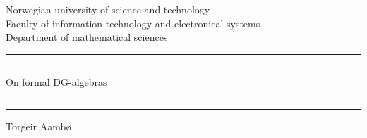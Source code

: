 \begin{titlingpage}



    \vspace*{5cm}
    \begin{center}
	Norwegian university of science and 		technology \\
	Faculty of information technology and 		electronical systems \\
	Department of mathematical sciences 
	\end{center}
    \rule[-11pt]{\textwidth}{1pt}
    \rule{\textwidth}{0.5pt}

    \begin{center}
    \Huge On formal DG-algebras 
    \end{center}

    \rule{\textwidth}{0.5pt}
    \rule[10.1pt]{\textwidth}{1pt}


    \begin{center}
    Torgeir Aambø
    \end{center}



    \vspace{\fill}



\end{titlingpage}